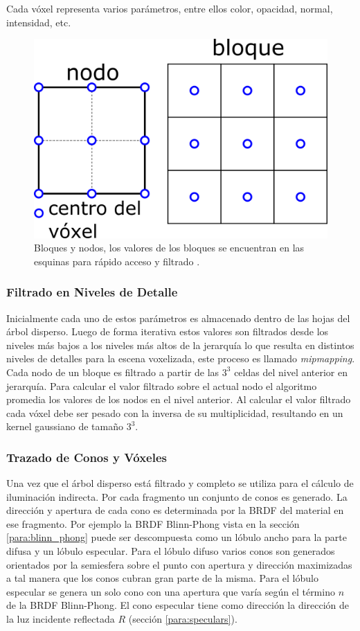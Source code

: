 Cada vóxel representa varios parámetros, entre ellos color, opacidad, normal, intensidad, etc.

\begin{figure}[H]
	\centering
	\includegraphics[width=0.3\linewidth]{media/bricks_vct.png}
	\caption{Bloques y nodos, los valores de los bloques se encuentran en las esquinas para rápido acceso y filtrado \cite{CNSGE11b}.}
	\label{fig:bricks_vct}
\end{figure}

\subsubsection{Filtrado en Niveles de Detalle}
\label{subsub:mipmaping_orig}
Inicialmente cada uno de estos parámetros es almacenado dentro de las hojas del árbol disperso. Luego de forma iterativa estos valores son filtrados desde los niveles más bajos a los niveles más altos de la jerarquía lo que resulta en distintos niveles de detalles para la escena voxelizada, este proceso es llamado \emph{mipmapping}. Cada nodo de un bloque es filtrado a partir de las $3^3$ celdas del nivel anterior en jerarquía. Para calcular el valor filtrado sobre el actual nodo el algoritmo promedia los valores de los nodos en el nivel anterior. Al calcular el valor filtrado cada vóxel debe ser pesado con la inversa de su multiplicidad, resultando en un kernel gaussiano de tamaño $3^3$. 

\subsubsection{Trazado de Conos y Vóxeles}
Una vez que el árbol disperso está filtrado y completo se utiliza para el cálculo de iluminación indirecta. Por cada fragmento un conjunto de conos es generado. La dirección y apertura de cada cono es determinada por la \ac{BRDF} del material en ese fragmento. Por ejemplo la \ac{BRDF} Blinn-Phong vista en la sección \ref{para:blinn_phong} puede ser descompuesta como un lóbulo ancho para la parte difusa y un lóbulo especular. Para el lóbulo difuso varios conos son generados orientados por la semiesfera sobre el punto con apertura y dirección maximizadas a tal manera que los conos cubran gran parte de la misma. Para el lóbulo especular se genera un solo cono con una apertura que varía según el término $n$ de la \ac{BRDF} Blinn-Phong. El cono especular tiene como dirección la dirección de la luz incidente reflectada $R$ (sección \ref{para:speculars}).

